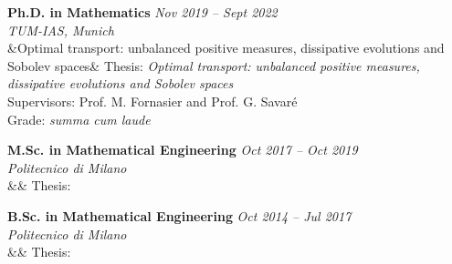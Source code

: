 \newcommand{\educationentry}[6]{%
  \textbf{#1} \hfill \textit{#3 -- #4} \\
  \textit{#2} \\
  \ifx&#5&%
  \else
    Thesis: \textit{#5} \\
  \fi
  #6
  \vspace{2mm}
}

\educationentry
  {Ph.D. in Mathematics}
  {TUM-IAS, Munich}
  {Nov 2019}{Sept 2022}
  {Optimal transport: unbalanced positive measures, dissipative evolutions and Sobolev spaces}
  {Supervisors: Prof. M. Fornasier and Prof. G. Savaré\\Grade: \textit{summa cum laude}}

\educationentry
  {M.Sc. in Mathematical Engineering}
  {Politecnico di Milano}
  {Oct 2017}{Oct 2019}
  {}
  {}

\educationentry
  {B.Sc. in Mathematical Engineering}
  {Politecnico di Milano}
  {Oct 2014}{Jul 2017}
  {}
  {}
